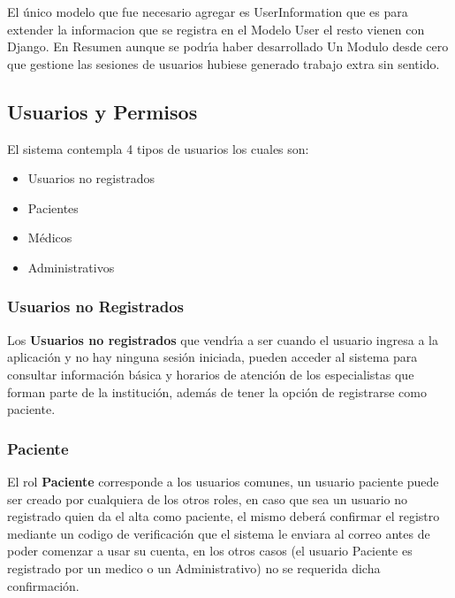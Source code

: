 %

El \'unico modelo que fue necesario agregar es UserInformation que es para 
extender la informacion que se registra en el Modelo User el resto vienen
con Django. En Resumen aunque se podr\'{\i}a haber desarrollado Un Modulo desde
cero que gestione las sesiones de usuarios hubiese generado trabajo extra sin
sentido.

\subsection{Usuarios y Permisos}

El sistema contempla 4 tipos de usuarios los cuales son: 

\begin{itemize}
    \item Usuarios no registrados 
    \item Pacientes
    \item M\'edicos
    \item Administrativos
\end{itemize}

\subsubsection{Usuarios no Registrados}

Los \textbf{Usuarios no registrados} que vendr\'{\i}a a ser cuando el usuario ingresa
a la aplicaci\'on y no hay ninguna sesi\'on iniciada, pueden acceder al sistema para 
consultar informaci\'on b\'asica y horarios de atenci\'on de los especialistas que 
forman parte de la instituci\'on, adem\'as de tener la opci\'on de registrarse 
como paciente.\\[0.1cm]    

\subsubsection{Paciente}

El rol \textbf{Paciente} corresponde a los usuarios comunes, un usuario paciente puede 
ser creado por cualquiera de los otros roles, en caso que sea un usuario no registrado
quien da el alta como paciente, el mismo deber\'a confirmar el registro mediante un
codigo de verificaci\'on que el sistema le enviara al correo antes de poder comenzar
a usar su cuenta, en los otros casos (el usuario Paciente es registrado por un 
medico o un Administrativo) no se requerida dicha confirmaci\'on.\\[0.1cm]

